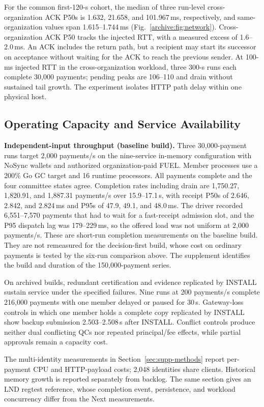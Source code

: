 For the common first-120-s cohort, the median of three run-level cross-organization
ACK P50s is 1.632, 21.658, and 101.967\,ms, respectively, and same-organization
values span 1.615--1.744\,ms (Fig.~\ref{archive:fig:network}). Cross-organization ACK P50
tracks the injected RTT, with a measured excess of 1.6--2.0\,ms. An ACK includes the
return path, but a recipient may start its successor on acceptance without
waiting for the ACK to reach the previous sender. At 100-ms injected RTT in the cross-organization workload,
three 300-s runs each complete 30,000 payments; pending peaks are 106--110 and
drain without sustained tail growth. The experiment isolates HTTP path delay
within one physical host.

\subsection{Operating Capacity and Service Availability}
\label{archive:sec:eval-operating}

\noindent\textbf{Independent-input throughput (baseline build).}
Three 30,000-payment runs target 2,000 payments/s on the nine-service
in-memory configuration with NoSync wallets and authorized organization-paid
FUEL. Member processes use a 200\% Go GC target and 16 runtime processors. All
payments complete and the four committee states agree. Completion rates
including drain are 1,750.27, 1,820.91, and 1,887.31 payments/s over
15.9--17.1\,s, with receipt P50s of 2.646, 2.842, and 2.824\,ms and P95s of
47.9, 49.1, and 48.0\,ms. The driver recorded 6,551--7,570 payments that had to
wait for a fast-receipt admission slot, and the P95 dispatch lag was
179--229\,ms, so the offered load was not uniform at 2,000 payments/s. These
are short-run completion measurements on the baseline build. They are not
remeasured for the decision-first build, whose cost on ordinary payments is
tested by the six-run comparison above. The supplement identifies the build
and duration of the 150,000-payment series.

On archived builds, redundant certification and evidence replicated by INSTALL
sustain service under the specified failures. Nine runs at 200 payments/s complete
216,000 payments with one member delayed or paused for 30\,s. Gateway-loss
controls in which one member holds a complete copy replicated by INSTALL
show backup submission 2.503--2.508\,s after INSTALL.
Conflict controls produce neither dual conflicting QCs nor repeated
principal/fee effects, while partial approvals remain a capacity cost.

The multi-identity measurements in Section~\ref{sec:supp-methods} report
per-payment CPU and HTTP-payload costs; 2,048 identities share clients.
Historical memory growth is reported separately from backlog. The same
section gives an LND regtest reference, whose completion event,
persistence, and workload concurrency differ from the Next measurements.
